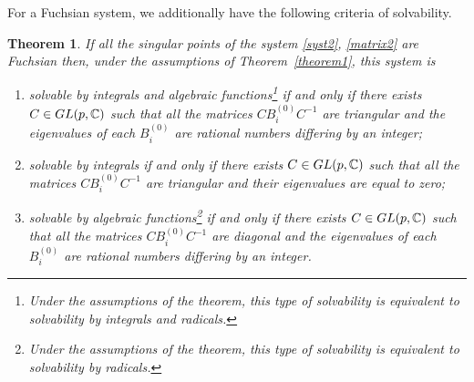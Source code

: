 \documentclass[11pt]{article}
\numberwithin{equation}{section}
\newtheorem{Theorem}{Theorem}[section]
\begin{document}
For a Fuchsian system, we additionally have the following criteria of solvability.

\begin{Theorem}\label{theorem3}
If all the singular points of the system \eqref{syst2}, \eqref{matrix2} are Fuchsian then, under the assumptions of Theorem~{\rm \ref{theorem1}}, this system is
\begin{enumerate}\itemsep=0pt
	\item[$1)$] solvable by integrals and algebraic functions\footnote{Under the assumptions of the theorem, this type of solvability is equivalent to solvability by integrals and radicals.} if and only if there exists
	$C\in{\rm GL}(p,\mathbb C)$ such that all the matrices $CB^{(0)}_iC^{-1}$ are triangular and the eigenvalues of each $B^{(0)}_i$ are rational numbers differing by an integer;
	\item[$2)$] solvable by integrals if and only if there exists $C\in{\rm GL}(p,\mathbb C)$ such that all the matrices $CB^{(0)}_iC^{-1}$ are triangular and their eigenvalues are equal to zero;
	\item[$3)$] solvable by algebraic functions\footnote{Under the assumptions of the theorem, this type of solvability is equivalent to solvability by radicals.} if and only if there exists $C\in{\rm GL}(p,\mathbb C)$ such that all the matrices $CB^{(0)}_iC^{-1}$ are diagonal and the eigenvalues of each $B^{(0)}_i$ are rational numbers differing by an integer.
\end{enumerate}
\end{Theorem}
\end{document}

